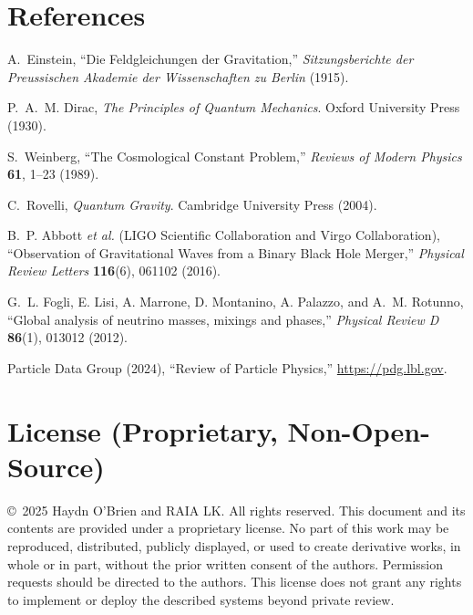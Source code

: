 \documentclass[11pt]{article}
\begin{document}
\section*{References}

\begin{thebibliography}{99}

A.~Einstein, ``Die Feldgleichungen der Gravitation,'' \emph{Sitzungsberichte der Preussischen Akademie der Wissenschaften zu Berlin} (1915).

P.~A.~M. Dirac, \emph{The Principles of Quantum Mechanics}. Oxford University Press (1930).

S.~Weinberg, ``The Cosmological Constant Problem,'' \emph{Reviews of Modern Physics} \textbf{61}, 1--23 (1989).

C.~Rovelli, \emph{Quantum Gravity}. Cambridge University Press (2004).

B.~P. Abbott \emph{et al.} (LIGO Scientific Collaboration and Virgo Collaboration), ``Observation of Gravitational Waves from a Binary Black Hole Merger,'' \emph{Physical Review Letters} \textbf{116}(6), 061102 (2016).

G.~L. Fogli, E. Lisi, A. Marrone, D. Montanino, A. Palazzo, and A.~M. Rotunno, ``Global analysis of neutrino masses, mixings and phases,'' \emph{Physical Review D} \textbf{86}(1), 013012 (2012).

Particle Data Group (2024), ``Review of Particle Physics,'' \url{https://pdg.lbl.gov}.

\end{thebibliography}

\section*{License (Proprietary, Non-Open-Source)}
{\small
\noindent \copyright~2025 Haydn O'Brien and RAIA LK. All rights reserved. This document and its contents are provided under a proprietary license. No part of this work may be reproduced, distributed, publicly displayed, or used to create derivative works, in whole or in part, without the prior written consent of the authors. Permission requests should be directed to the authors. This license does not grant any rights to implement or deploy the described systems beyond private review.
}
\end{document}
